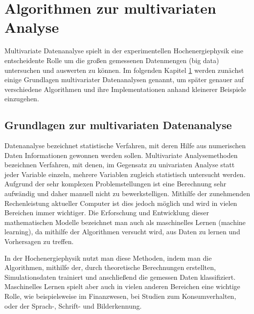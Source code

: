 \chapter{Algorithmen zur multivariaten Analyse}
\label{ch:algorithmen}

{}	%

Multivariate Datenanalyse spielt in der experimentellen Hochenergiephysik eine entscheidente Rolle um die gro\ss en gemessenen Datenmengen (big data) untersuchen und auswerten zu k\"onnen. Im folgenden Kapitel \ref{ch:algorithmen} werden zun\"achst einige Grundlagen multivariater Datenanalysen genannt, um sp\"ater genauer auf verschiedene Algorithmen und ihre Implementationen anhand kleinerer Beispiele einzugehen.

\section{Grundlagen zur multivariaten Datenanalyse}
\label{ch:Theorie:sec:Algorithmen}

Datenanalyse bezeichnet statistische Verfahren, mit deren Hilfe aus numerischen Daten Informationen gewonnen werden sollen.
Multivariate Analysemethoden bezeichnen Verfahren, mit denen, im Gegensatz zu univariaten Analyse statt jeder Variable einzeln, mehrere Variablen zugleich statistisch untersucht werden.\\
Aufgrund der sehr komplexen Problemstellungen ist eine Berechnung sehr aufw\"andig und daher manuell nicht zu bewerkstelligen. Mithilfe der zunehmenden Rechenleistung aktueller Computer ist dies jedoch m\"oglich und wird in vielen Bereichen immer wichtiger. Die Erforschung und Entwicklung dieser mathematischen Modelle bezeichnet man auch als maschinelles Lernen (machine learning), da mithilfe der Algorithmen versucht wird, aus Daten zu lernen und Vorhersagen zu treffen. \cite{SWB-455193959}

In der Hochenergiephysik nutzt man diese Methoden, indem man die Algorithmen, mithilfe der, durch theoretische Berechnungen erstellten, Simulationsdaten trainiert und anschlie\ss end die gemessen Daten klassifiziert.\\ 
Maschinelles Lernen spielt aber auch in vielen anderen Bereichen eine wichtige Rolle, wie beispielsweise im Finanzwesen, bei Studien zum Konsumverhalten, oder der Sprach-, Schrift- und Bilderkennung.

